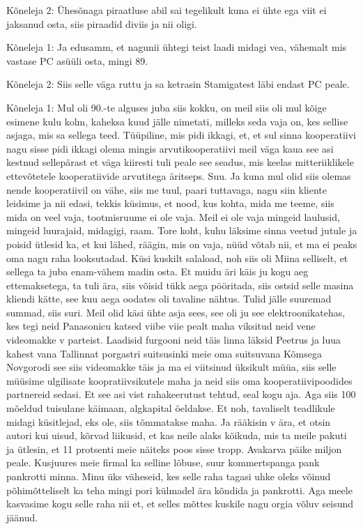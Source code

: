 Kõneleja 2:
Ühesõnaga piraatluse abil sai tegelikult kuna ei ühte ega viit ei jaksanud osta, siis piraadid diviis ja nii oligi.
                 
Kõneleja 1:
Ja edusamm, et nagunii ühtegi teist laadi midagi vea, vähemalt mis vastase PC asüüli osta, mingi 89.
                 
Kõneleja 2:
Siis selle väga ruttu ja sa ketrasin Stamigatest läbi endast PC peale.
                 
Kõneleja 1:
Mul oli 90.-te alguses juba siis kokku, on meil siis oli mul kõige esimene kulu kolm, kaheksa kuud jälle nimetati, milleks seda vaja on, kes sellise asjaga, mis sa sellega teed. Tüüpiline, mis pidi ikkagi, et, et sul sinna kooperatiivi nagu sisse pidi ikkagi olema mingis arvutikooperatiivi meil väga kaua see asi kestnud sellepärast et väga kiiresti tuli peale see seadus, mis keelas mitteriiklikele ettevõtetele kooperatiivide arvutitega äritseps. Suu. Ja kuna mul olid siis olemas nende kooperatiivil on vähe, siis me tuul, paari tuttavaga, nagu siin kliente leidsime ja nii edasi, tekkis küsimus, et nood, kus kohta, mida me teeme, siis mida on veel vaja, tootmisruume ei ole vaja. Meil ei ole vaja mingeid laulusid, mingeid luurajaid, midagigi, raam.
Tore koht, kuhu läksime sinna veetud jutule ja poisid ütlesid ka, et kui lähed, räägin, mis on vaja, nüüd võtab nii, et ma ei peaks oma nagu raha looksutadad. Küsi kuskilt salaload, noh siis oli Miina selliselt, et sellega ta juba enam-vähem madin osta. Et muidu äri käis ju kogu aeg ettemaksetega, ta tuli ära, siis võisid tükk aega pööritada, siis ostsid selle masina kliendi kätte, see kuu aega oodates oli tavaline nähtus. Tulid jälle suuremad summad, siis suri. Meil olid käsi ühte asja sees, see oli ju see elektroonikatehas, kes tegi neid Panasonicu katsed viibe viie pealt maha viksitud neid vene videomakke v parteist. Laadisid furgooni neid täis linna läksid Peetrus ja luua kahest vana Tallinnat porgastri suitsusinki meie oma suitsuvana Kõmsega Novgorodi see siis videomakke täis ja ma ei viitsinud üksikult müüa, siis selle müüsime ulgilisate koopratiivsikutele maha ja neid siis oma kooperatiivipoodides partnereid sedasi. Et see asi vist rahakeerutust tehtud, seal kogu aja. Aga siis 100 mõeldud tuisulane käimaan, algkapital öeldakse. Et noh, tavaliselt teadlikule midagi küsitlejad, eks ole, siis tõmmatakse maha. Ja rääkisin v ära, et otsin autori kui uisud, kõrvad liikusid, et kas neile alaks kõikuda, mis ta meile pakuti ja ütlesin, et 11 protsenti meie näiteks poos sisse tropp.
Avakarva päike miljon peale.
Kusjuures meie firmal ka selline lõbuse, suur kommertspanga pank pankrotti minna. Minu üks väheseid, kes selle raha tagasi uhke oleks võinud põhimõtteliselt ka teha mingi pori külmadel ära kõndida ja pankrotti. Aga meele kasvasime kogu selle raha nii et, et selles mõttes kuskile nagu orgia võluv seisund jäänud.
                 
